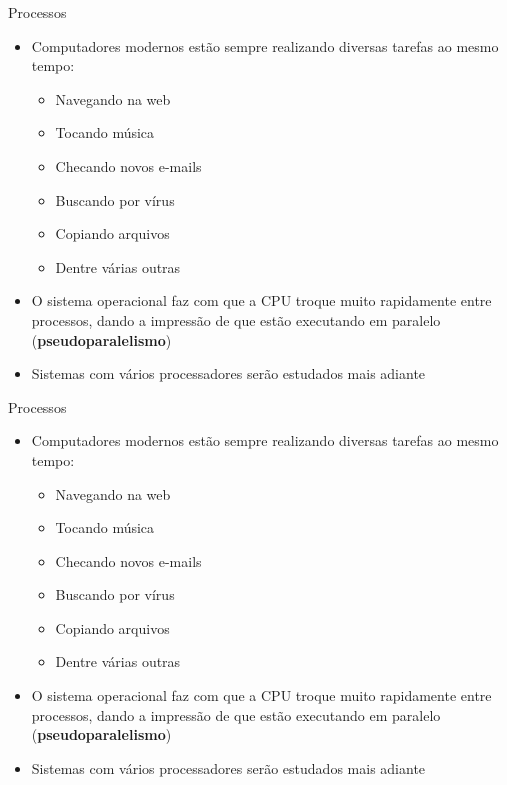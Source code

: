\documentclass{beamer}
\begin{document}
\begin{frame}{Processos}
	\begin{itemize}
		\item Computadores modernos estão sempre realizando diversas tarefas ao mesmo tempo:
		\begin{itemize}
			\item Navegando na web
			\item Tocando música
			\item Checando novos e-mails
			\item Buscando por vírus
			\item Copiando arquivos
			\item Dentre várias outras
		\end{itemize}
		\item O sistema operacional faz com que a CPU troque muito rapidamente entre processos, dando a impressão de que estão executando em paralelo (\textbf{pseudoparalelismo})
		\item Sistemas com vários processadores serão estudados mais adiante
	\end{itemize}
\end{frame}
\begin{frame}{Processos}
	\begin{itemize}
		\item Computadores modernos estão sempre realizando diversas tarefas ao mesmo tempo:
		\begin{itemize}
			\item Navegando na web
			\item Tocando música
			\item Checando novos e-mails
			\item Buscando por vírus
			\item Copiando arquivos
			\item Dentre várias outras
		\end{itemize}
		\item O sistema operacional faz com que a CPU troque muito rapidamente entre processos, dando a impressão de que estão executando em paralelo (\textbf{pseudoparalelismo})
		\item Sistemas com vários processadores serão estudados mais adiante
	\end{itemize}
\end{frame}
\end{document}
